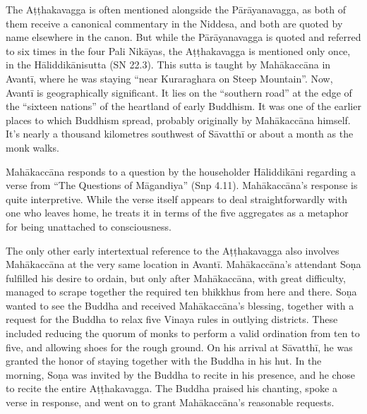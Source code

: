 \documentclass[12pt,openany]{book}%
\begin{document}
The \textsanskrit{Aṭṭhakavagga} is often mentioned alongside the \textsanskrit{Pārāyanavagga}, as both of them receive a canonical commentary in the Niddesa, and both are quoted by name elsewhere in the canon. But while the \textsanskrit{Pārāyanavagga} is quoted and referred to six times in the four Pali \textsanskrit{Nikāyas}, the \textsanskrit{Aṭṭhakavagga} is mentioned only once, in the \textsanskrit{Hāliddikānisutta} (SN 22.3). This sutta is taught by \textsanskrit{Mahākaccāna} in \textsanskrit{Avantī}, where he was staying “near Kuraraghara on Steep Mountain”. Now, \textsanskrit{Avantī} is geographically significant. It lies on the “southern road” at the edge of the “sixteen nations” of the heartland of early Buddhism. It was one of the earlier places to which Buddhism spread, probably originally by \textsanskrit{Mahākaccāna} himself. It’s nearly a thousand kilometres southwest of \textsanskrit{Sāvatthī} or about a month as the monk walks.

\textsanskrit{Mahākaccāna} responds to a question by the householder \textsanskrit{Hāliddikāni} regarding a verse from “The Questions of \textsanskrit{Māgandiya}” (Snp 4.11). \textsanskrit{Mahākaccāna}’s response is quite interpretive. While the verse itself appears to deal straightforwardly with one who leaves home, he treats it in terms of the five aggregates as a metaphor for being unattached to consciousness.

The only other early intertextual reference to the \textsanskrit{Aṭṭhakavagga} also involves \textsanskrit{Mahākaccāna} at the very same location in \textsanskrit{Avantī}. \textsanskrit{Mahākaccāna}’s attendant \textsanskrit{Soṇa} fulfilled his desire to ordain, but only after \textsanskrit{Mahākaccāna}, with great difficulty, managed to scrape together the required ten bhikkhus from here and there. \textsanskrit{Soṇa} wanted to see the Buddha and received \textsanskrit{Mahākaccāna}’s blessing, together with a request for the Buddha to relax five Vinaya rules in outlying districts. These included reducing the quorum of monks to perform a valid ordination from ten to five, and allowing shoes for the rough ground. On his arrival at \textsanskrit{Sāvatthī}, he was granted the honor of staying together with the Buddha in his hut. In the morning, \textsanskrit{Soṇa} was invited by the Buddha to recite in his presence, and he chose to recite the entire \textsanskrit{Aṭṭhakavagga}. The Buddha praised his chanting, spoke a verse in response, and went on to grant \textsanskrit{Mahākaccāna}’s reasonable requests.
\end{document}
